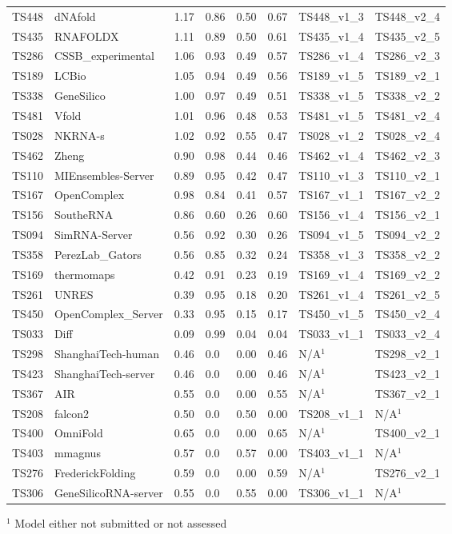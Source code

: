 \begin{table}[ht]
{\begin{tabular}{llllllll}
TS448 & dNAfold & 1.17 & 0.86 & 0.50 & 0.67 & TS448\_v1\_3 & TS448\_v2\_4 \\ 
TS435 & RNAFOLDX & 1.11 & 0.89 & 0.50 & 0.61 & TS435\_v1\_4 & TS435\_v2\_5 \\ 
TS286 & CSSB\_experimental & 1.06 & 0.93 & 0.49 & 0.57 & TS286\_v1\_4 & TS286\_v2\_3 \\ 
TS189 & LCBio & 1.05 & 0.94 & 0.49 & 0.56 & TS189\_v1\_5 & TS189\_v2\_1 \\ 
TS338 & GeneSilico & 1.00 & 0.97 & 0.49 & 0.51 & TS338\_v1\_5 & TS338\_v2\_2 \\ 
TS481 & Vfold & 1.01 & 0.96 & 0.48 & 0.53 & TS481\_v1\_5 & TS481\_v2\_4 \\ 
TS028 & NKRNA-s & 1.02 & 0.92 & 0.55 & 0.47 & TS028\_v1\_2 & TS028\_v2\_4 \\ 
TS462 & Zheng & 0.90 & 0.98 & 0.44 & 0.46 & TS462\_v1\_4 & TS462\_v2\_3 \\ 
TS110 & MIEnsembles-Server & 0.89 & 0.95 & 0.42 & 0.47 & TS110\_v1\_3 & TS110\_v2\_1 \\ 
TS167 & OpenComplex & 0.98 & 0.84 & 0.41 & 0.57 & TS167\_v1\_1 & TS167\_v2\_2 \\ 
TS156 & SoutheRNA & 0.86 & 0.60 & 0.26 & 0.60 & TS156\_v1\_4 & TS156\_v2\_1 \\ 
TS094 & SimRNA-Server & 0.56 & 0.92 & 0.30 & 0.26 & TS094\_v1\_5 & TS094\_v2\_2 \\ 
TS358 & PerezLab\_Gators & 0.56 & 0.85 & 0.32 & 0.24 & TS358\_v1\_3 & TS358\_v2\_2 \\ 
TS169 & thermomaps & 0.42 & 0.91 & 0.23 & 0.19 & TS169\_v1\_4 & TS169\_v2\_2 \\ 
TS261 & UNRES & 0.39 & 0.95 & 0.18 & 0.20 & TS261\_v1\_4 & TS261\_v2\_5 \\ 
TS450 & OpenComplex\_Server & 0.33 & 0.95 & 0.15 & 0.17 & TS450\_v1\_5 & TS450\_v2\_4 \\ 
TS033 & Diff & 0.09 & 0.99 & 0.04 & 0.04 & TS033\_v1\_1 & TS033\_v2\_4 \\ 
TS298 & ShanghaiTech-human & 0.46 & 0.0 & 0.00 & 0.46 & N/A$^{1}$ & TS298\_v2\_1 \\ 
TS423 & ShanghaiTech-server & 0.46 & 0.0 & 0.00 & 0.46 & N/A$^{1}$ & TS423\_v2\_1 \\ 
TS367 & AIR & 0.55 & 0.0 & 0.00 & 0.55 & N/A$^{1}$ & TS367\_v2\_1 \\ 
TS208 & falcon2 & 0.50 & 0.0 & 0.50 & 0.00 & TS208\_v1\_1 & N/A$^{1}$ \\ 
TS400 & OmniFold & 0.65 & 0.0 & 0.00 & 0.65 & N/A$^{1}$ & TS400\_v2\_1 \\ 
TS403 & mmagnus & 0.57 & 0.0 & 0.57 & 0.00 & TS403\_v1\_1 & N/A$^{1}$ \\ 
TS276 & FrederickFolding & 0.59 & 0.0 & 0.00 & 0.59 & N/A$^{1}$ & TS276\_v2\_1 \\ 
TS306 & GeneSilicoRNA-server & 0.55 & 0.0 & 0.55 & 0.00 & TS306\_v1\_1 & N/A$^{1}$ \\ 
\bottomrule
\end{tabular}%
}
\begin{flushleft}\footnotesize $^{1}$ Model either not submitted or not assessed\end{flushleft}
\end{table}
